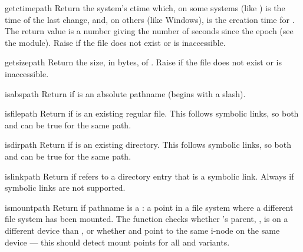 \begin{funcdesc}{getctime}{path}
Return the system's ctime which, on some systems (like \UNIX) is the
time of the last change, and, on others (like Windows), is the
creation time for .  The return
value is a number giving the number of seconds since the epoch (see the 
 module).  Raise  if the file does
not exist or is inaccessible.
\end{funcdesc}

\begin{funcdesc}{getsize}{path}
Return the size, in bytes, of .  Raise
 if the file does not exist or is inaccessible.
\end{funcdesc}

\begin{funcdesc}{isabs}{path}
Return  if  is an absolute pathname (begins with a
slash).
\end{funcdesc}

\begin{funcdesc}{isfile}{path}
Return  if  is an existing regular file.  This follows
symbolic links, so both  and 
can be true for the same path.
\end{funcdesc}

\begin{funcdesc}{isdir}{path}
Return  if  is an existing directory.  This follows
symbolic links, so both  and  can
be true for the same path.
\end{funcdesc}

\begin{funcdesc}{islink}{path}
Return  if  refers to a directory entry that is a
symbolic link.  Always  if symbolic links are not supported.
\end{funcdesc}

\begin{funcdesc}{ismount}{path}
Return  if pathname  is a : a point in
a file system where a different file system has been mounted.  The
function checks whether 's parent, , is
on a different device than , or whether 
and  point to the same i-node on the same device --- this
should detect mount points for all \UNIX{} and \POSIX{} variants.
\end{funcdesc}

